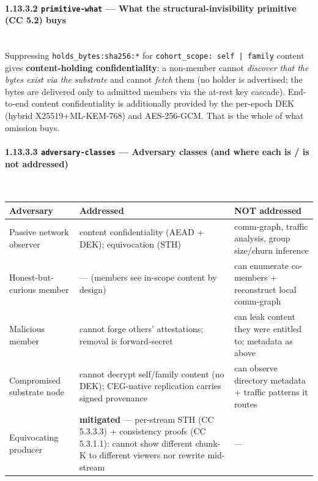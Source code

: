 \documentclass[11pt]{article}
\begin{document}
\paragraph{1.13.3.2 \texttt{primitive-what} — What the structural-invisibility primitive (CC 5.2) buys}\mbox{}\\


Suppressing \texttt{holds\_bytes:sha256:*} for \texttt{cohort\_scope: self | family} content gives \textbf{content-holding confidentiality}: a non-member cannot \textit{discover that the bytes exist via the substrate} and cannot \textit{fetch} them (no holder is advertised; the bytes are delivered only to admitted members via the at-rest key cascade). End-to-end content confidentiality is additionally provided by the per-epoch DEK (hybrid X25519+ML-KEM-768) and AES-256-GCM. That is the whole of what omission buys.


\paragraph{1.13.3.3 \texttt{adversary-classes} — Adversary classes (and where each is / is not addressed)}\mbox{}\\


{\footnotesize
\begin{longtable}{|p{5.33cm}|p{5.33cm}|p{5.33cm}|}\hline
\textbf{Adversary} & \textbf{Addressed} & \textbf{NOT addressed} \\ \hline\endhead
Passive network observer & content confidentiality (AEAD + DEK); equivocation (STH) & comm-graph, traffic analysis, group size/churn inference \\ \hline
Honest-but-curious member & — (members see in-scope content by design) & can enumerate co-members + reconstruct local comm-graph \\ \hline
Malicious member & cannot forge others' attestations; removal is forward-secret & can leak content they were entitled to; metadata as above \\ \hline
Compromised substrate node & cannot decrypt self/family content (no DEK); CEG-native replication carries signed provenance & can observe directory metadata + traffic patterns it routes \\ \hline
Equivocating producer & \textbf{mitigated} — per-stream STH (CC 5.3.3.3) + consistency proofs (CC 5.3.1.1): cannot show different chunk-K to different viewers nor rewrite mid-stream & — \\ \hline
\end{longtable}}
\end{document}
